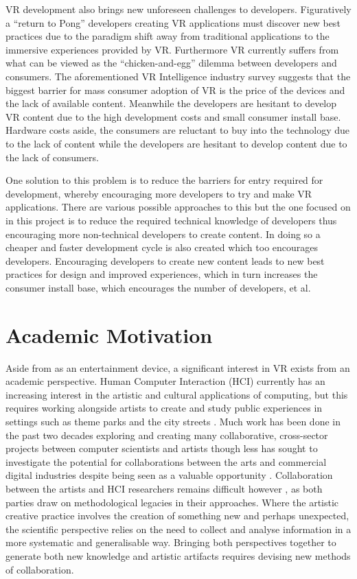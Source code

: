 \documentclass{l4proj}
\begin{document}
VR development also brings new unforeseen challenges to developers. Figuratively a ``return to Pong'' developers creating VR applications must discover new best practices due to the paradigm shift away from traditional applications to the immersive experiences provided by VR. Furthermore VR currently suffers from what can be viewed as the ``chicken-and-egg'' dilemma between developers and consumers. The aforementioned VR Intelligence industry survey suggests that the biggest barrier for mass consumer adoption of VR is the price of the devices and the lack of available content. Meanwhile the developers are hesitant to develop VR content due to the high development costs and small consumer install base. Hardware costs aside, the consumers are reluctant to buy into the technology due to the lack of content while the developers are hesitant to develop content due to the lack of consumers.

One solution to this problem is to reduce the barriers for entry required for development, whereby encouraging more developers to try and make VR applications. There are various possible approaches to this but the one focused on in this project is to reduce the required technical knowledge of developers thus encouraging more non-technical developers to create content. In doing so a cheaper and faster development cycle is also created which too encourages developers. Encouraging developers to create new content leads to new best practices for design and improved experiences, which in turn increases the consumer install base, which encourages the number of developers, et al. 

\section{Academic Motivation}
\label{sec:introductionacademicmotivation}
Aside from as an entertainment device, a significant interest in VR exists from an academic perspective. Human Computer Interaction (HCI) currently has an increasing interest in the artistic and cultural applications of computing, but this requires working alongside artists to create and study public experiences in settings such as theme parks and the city streets \cite{drthesis}. Much work has been done in the past two decades exploring and creating many collaborative, cross-sector projects between computer scientists and artists though less has sought to investigate the potential for collaborations between the arts and commercial digital industries despite being seen as a valuable opportunity \cite{drthesis}. Collaboration between the artists and HCI researchers remains difficult however \cite{drwbenford} \cite{drweng2}, as both parties draw on methodological legacies in their approaches. Where the artistic creative practice involves the creation of something new and perhaps unexpected, the scientific perspective relies on the need to collect and analyse information in a more systematic and generalisable way. Bringing both perspectives together to generate both new knowledge and artistic artifacts requires devising new methods of collaboration. 
\end{document}
